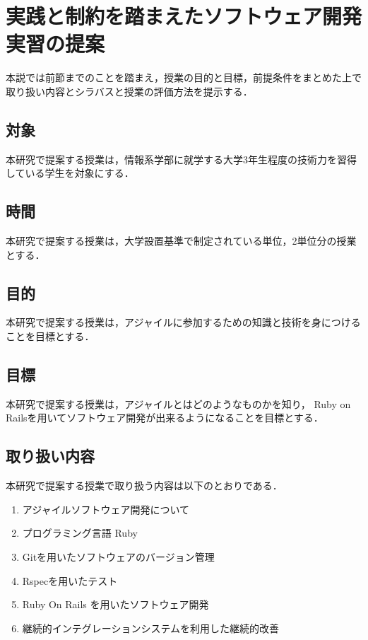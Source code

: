 \section{実践と制約を踏まえたソフトウェア開発実習の提案}

本説では前節までのことを踏まえ，授業の目的と目標，前提条件をまとめた上で取り扱い内容とシラバスと授業の評価方法を提示する．

\subsection{対象}

本研究で提案する授業は，情報系学部に就学する大学3年生程度の技術力を習得している学生を対象にする．

\subsection{時間}

本研究で提案する授業は，大学設置基準\cite{univ_criteria}で制定されている単位，2単位分の授業とする．

\subsection{目的}

本研究で提案する授業は，アジャイルに参加するための知識と技術を身につけることを目標とする．

\subsection{目標}

本研究で提案する授業は，アジャイルとはどのようなものかを知り， Ruby on Railsを用いてソフトウェア開発が出来るようになることを目標とする．

\subsection{取り扱い内容
  \label{tech-content}
}

本研究で提案する授業で取り扱う内容は以下のとおりである．

\begin{enumerate}
  \item アジャイルソフトウェア開発について
  \item プログラミング言語 Ruby
  \item Gitを用いたソフトウェアのバージョン管理
  \item Rspecを用いたテスト
  \item Ruby On Rails を用いたソフトウェア開発
  \item 継続的インテグレーションシステムを利用した継続的改善
\end{enumerate}

